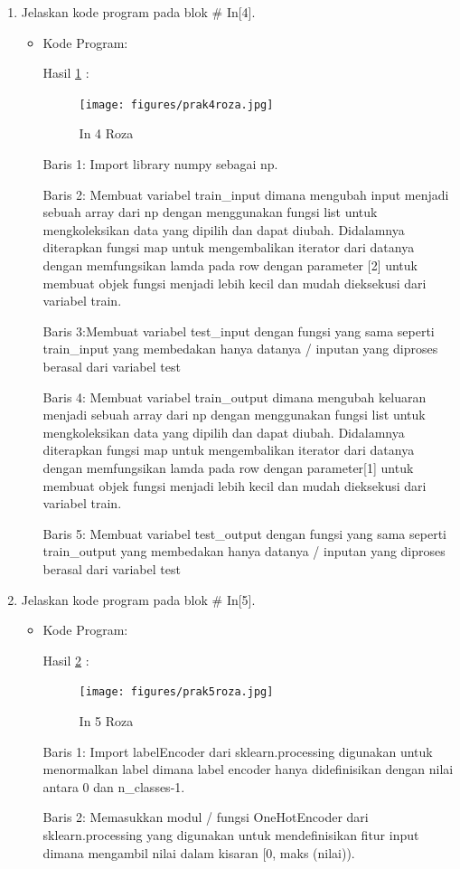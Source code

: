 \begin{enumerate}
\item Jelaskan kode program pada blok \# In[4].
\begin{itemize}
\item Kode Program:

\par Hasil \ref{in4roza} :
\begin{figure}[!hbtp]
\centering
\texttt{[image: figures/prak4roza.jpg]}
\caption{In 4 Roza}
\label{in4roza}
\end{figure}
\par Baris 1: Import library numpy sebagai np.
\par Baris 2: Membuat variabel train\_input dimana mengubah input menjadi sebuah array dari np dengan menggunakan fungsi list untuk mengkoleksikan data yang dipilih dan dapat diubah. Didalamnya diterapkan fungsi map untuk mengembalikan iterator dari datanya dengan memfungsikan lamda pada row dengan parameter [2] untuk membuat objek fungsi menjadi lebih kecil dan mudah dieksekusi dari variabel train.
\par Baris 3:Membuat variabel test\_input dengan fungsi yang sama seperti train\_input yang membedakan hanya datanya / inputan yang diproses berasal dari variabel test
\par Baris 4: Membuat variabel train\_output dimana mengubah keluaran menjadi sebuah array dari np dengan menggunakan fungsi list untuk mengkoleksikan data yang dipilih dan dapat diubah. Didalamnya diterapkan fungsi map untuk mengembalikan iterator dari datanya dengan memfungsikan lamda pada row dengan parameter[1] untuk membuat objek fungsi menjadi lebih kecil dan mudah dieksekusi dari variabel train.
\par Baris 5: Membuat variabel test\_output dengan fungsi yang sama seperti train\_output yang membedakan hanya datanya / inputan yang diproses berasal dari variabel test
\end{itemize}
\par

\item Jelaskan kode program pada blok \# In[5].
\begin{itemize}
\item Kode Program:

\par Hasil \ref{in5roza} :
\begin{figure}[!hbtp]
\centering
\texttt{[image: figures/prak5roza.jpg]}
\caption{In 5 Roza}
\label{in5roza}
\end{figure}
\par Baris 1: Import labelEncoder dari sklearn.processing digunakan untuk menormalkan label dimana label encoder hanya didefinisikan dengan nilai antara 0 dan n\_classes-1.
\par Baris 2: Memasukkan modul / fungsi OneHotEncoder dari sklearn.processing yang digunakan untuk mendefinisikan fitur input dimana mengambil nilai dalam kisaran [0, maks (nilai)).
\end{itemize}
\par


\end{enumerate}
